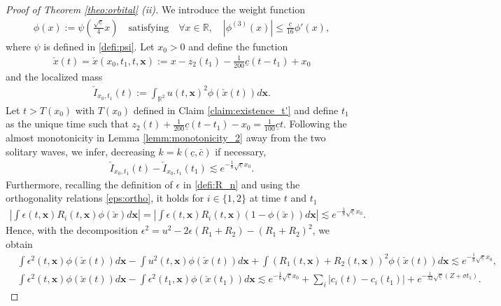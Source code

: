 \documentclass[reqno,10pt]{amsart}
\numberwithin{equation}{section}
\newcommand{\bx}{\mathbf{x}}
\begin{document}
\begin{proof}[Proof of Theorem \ref{theo:orbital} (ii)]
We introduce the weight function
        \begin{align}\label{defi:phi}
            \phi(x) := \psi \left( \frac{\sqrt{\underline{c}}}{4} x \right) \quad \text{satisfying} \quad \forall x \in \mathbb{R}, \quad \left\vert \phi^{(3)}(x) \right\vert \leq \frac{\underline{c}}{16} \phi'(x),
        \end{align}
where $\psi$ is defined in \eqref{defi:psi}. Let $x_0>0$ and define the function
\begin{align*}
	\check{x}(t)= \check{x}(x_0,t_1,t,\bx) := x-z_2(t_1) - \frac1{200} \underline{c} (t-t_1) +x_0
\end{align*}
and the localized mass
\begin{align*}
	\check{I}_{x_0,t_1}(t) := \int_{\mathbb{R}^2} u(t,\bx)^2 \phi(\check{x}(t)) d\bx.
\end{align*}
Let $t>T(x_0)$ with $T(x_0)$ defined in Claim \ref{claim:existence_t'} and define $t_1$ as the unique time such that $z_2(t)+ \frac1{200} \underline{c} (t-t_1)-x_0=\frac1{100} \underline{c} t$. Following the almost monotonicity in Lemma \ref{lemm:monotonicity_2} away from the two solitary waves, we infer, decreasing $k=k(\underline{c},\bar{c})$ if necessary,
\begin{align*}
	\check{I}_{x_0,t_1}(t)- \check{I}_{x_0,t_1}(t_1) \lesssim e^{-\frac{1}{8}\sqrt{\underline{c}} x_0}.
\end{align*}
Furthermore, recalling the definition of $\epsilon$ in \eqref{defi:R_n} and using the orthogonality relations \eqref{eps:ortho}, it holds for $i\in \{1,2\}$ at time $t$ and $t_1$
\begin{align*}
	\left\vert \int \epsilon(t,\bx)R_i(t,\bx) \phi(\check{x}) d\bx \right\vert = \left\vert \int \epsilon(t,\bx)R_i(t,\bx) \left( 1- \phi(\check{x}) \right) d\bx \right\vert \lesssim e^{-\frac{1}{8} \sqrt{\underline{c}}x_0} .
\end{align*}
Hence, with the decomposition $\epsilon^2 = u^2-2\epsilon(R_1+R_2) - (R_1+R_2)^2$, we obtain
\begin{align*}
	& \int \epsilon^2(t,\bx) \phi(\check{x}(t)) d\bx - \int u^2(t,\bx) \phi(\check{x}(t)) d\bx+ \int \left( R_1(t,\bx) + R_2(t,\bx) \right)^2 \phi(\check{x}(t)) d\bx \lesssim e^{-\frac{1}{8}\sqrt{\underline{c}}x_0}, \\
	& \int \epsilon^2(t,\bx) \phi(\check{x}(t)) d\bx -\int \epsilon^2(t_1,\bx) \phi(\check{x}(t_1)) d\bx \lesssim e^{-\frac{1}{8}\sqrt{\underline{c}}x_0} + \sum_i \left\vert c_i(t)-c_i(t_1) \right\vert +e^{-\frac{1}{32}\sqrt{\underline{c}}(Z+ \sigma t_1)}.

\end{align*}
\end{proof}
\end{document}
